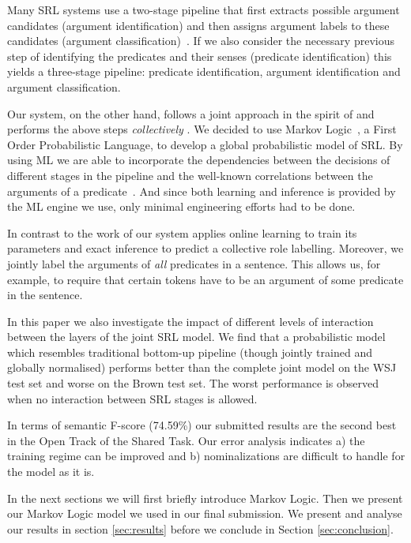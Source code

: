 
 
Many SRL systems use a two-stage pipeline that first extracts possible argument candidates (argument identification) and then assigns argument labels to these candidates (argument classification)~\citep{xue04calibrating}. If we also consider the necessary previous step of identifying the predicates and their senses (predicate identification) this yields a three-stage pipeline: predicate identification, argument identification and argument classification. 

Our system, on the other hand, follows a joint approach in the spirit of \cite{toutanova05joint} and performs the above steps \emph{collectively} . We decided to use Markov Logic~\citep[ML,][]{richardson05markov}, a First Order Probabilistic Language, to develop a global probabilistic model of SRL. By using ML we are able to incorporate the dependencies between the decisions of different stages in the pipeline and the well-known correlations between the arguments of a predicate~\citep{punyakanok05generalized}. And since both learning and inference is provided by the ML engine we use, only minimal engineering efforts had to be done.

In contrast to the work of \cite{toutanova05joint} our system applies online learning to train its parameters and exact inference to predict a collective role labelling. Moreover, we jointly label the arguments of \emph{all} predicates in a sentence. This allows us, for example, to require that certain tokens have to be an argument of some predicate in the sentence.  

In this paper we also investigate the impact of different levels of interaction between the layers of the joint SRL model. We find that a probabilistic model which resembles traditional bottom-up pipeline (though jointly trained and globally normalised) performs better than the complete joint model on the WSJ test set and worse on the Brown test set. The worst performance is observed when no interaction between SRL stages is allowed.

In terms of semantic F-score (74.59\%) our submitted results are the second best in the Open Track of the Shared Task. Our error analysis indicates a) the training regime can be improved and b) nominalizations are difficult to handle for the model as it is. 

In the next sections we will first briefly introduce Markov Logic. Then we present our Markov Logic model we used in our final submission. We present and analyse our results in section \ref{sec:results} before we conclude in Section \ref{sec:conclusion}.

